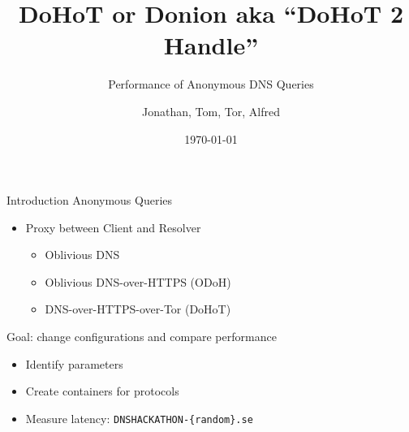 \documentclass[xcolor=x11names,dvipsnames,aspectratio=169]{beamer}
\title{\huge DoHoT or Donion aka ``DoHoT 2 Handle''}
\subtitle{Performance of Anonymous DNS Queries}
\author{\small Jonathan, Tom, Tor, Alfred}
\date{\today}
\begin{document}
    \setcounter{showProgressBar}{0}
	\setcounter{showSlideNumbers}{0}

	\frame{\titlepage}

	\setcounter{framenumber}{0}
	\setcounter{showProgressBar}{1}
	\setcounter{showSlideNumbers}{1}

    \begin{frame}{Introduction}
        Anonymous Queries
        \begin{itemize}
            \item Proxy between Client and Resolver
            \begin{itemize}
                \item Oblivious DNS
                \item Oblivious DNS-over-HTTPS (ODoH)
                \item DNS-over-HTTPS-over-Tor (DoHoT)
            \end{itemize}
        \end{itemize}
        \pause
        \vspace{1em}
        Goal: change configurations and compare performance
        \begin{itemize}
            \item Identify parameters
            \item Create containers for protocols
            \item Measure latency: \texttt{DNSHACKATHON-\{random\}.se}
        \end{itemize}
    \end{frame}
\end{document}
